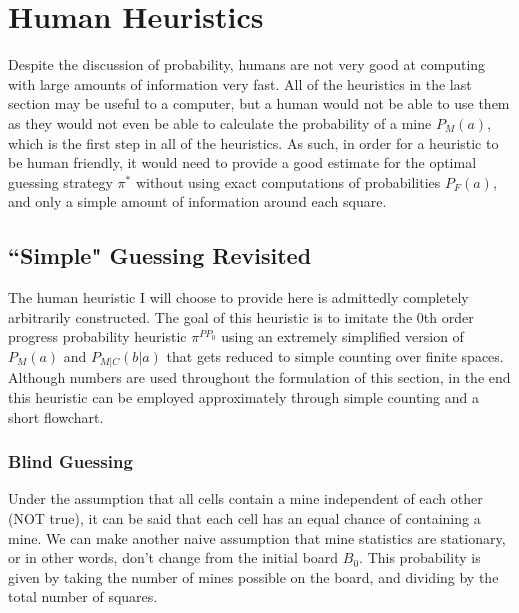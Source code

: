 \section{Human Heuristics}
Despite the discussion of probability, humans are not very good at computing with large amounts of information very fast. All of the heuristics in the last section may be useful to a computer, but a human would not be able to use them as they would not even be able to calculate the probability of a mine $P_M(a)$, which is the first step in all of the heuristics. As such, in order for a heuristic to be human friendly, it would need to provide a good estimate for the optimal guessing strategy $\pi^*$ without using exact computations of probabilities $P_F(a)$, and only a simple amount of information around each square.

\subsection{``Simple" Guessing Revisited}\label{sec:simple_guessing}
The human heuristic I will choose to provide here is admittedly completely arbitrarily constructed. The goal of this heuristic is to imitate the 0th order progress probability heuristic $\pi^{PP_0}$ using an extremely simplified version of $P_M(a)$ and $P_{M|C}(b|a)$ that gets reduced to simple counting over finite spaces. Although numbers are used throughout the formulation of this section, in the end this heuristic can be employed approximately through simple counting and a short flowchart.\\

\subsubsection*{Blind Guessing}
Under the assumption that all cells contain a mine independent of each other (NOT true), it can be said that each cell has an equal chance of containing a mine. We can make another naive assumption that mine statistics are stationary, or in other words, don't change from the initial board $B_0$. This probability is given by taking the number of mines possible on the board, and dividing by the total number of squares.



